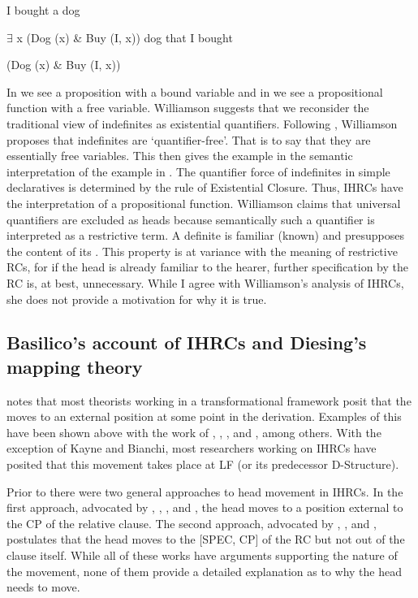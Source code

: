 \documentclass[output=paper]{LSP/langsci}
\begin{document}
\ea I bought a dog	\label{boyle40}

$\exists$ x (Dog (x) \& Buy (I, x))
\ex dog that I bought \label{boyle41}

(Dog (x) \& Buy (I, x))
\z	
	
In  we see a proposition with a bound variable and in  we see a propositional function with a free variable. Williamson suggests that we reconsider the traditional view of indefinites as existential quantifiers. Following \citet{Heim1982}, Williamson proposes that indefinites are `quantifier-free'. That is to say that they are essentially free variables. This then gives the example in  the semantic interpretation of the example in . The quantifier force of indefinites in simple declaratives is determined by the rule of Existential Closure. Thus, IHRCs have the interpretation of a propositional function. Williamson claims that universal quantifiers are excluded as heads because semantically such a quantifier is interpreted as a restrictive term. A definite is familiar (known) and presupposes the content of its .  This property is at variance with the meaning of restrictive RCs, for if the head is already familiar to the hearer, further specification by the RC is, at best, unnecessary.  While I agree with Williamson's analysis of IHRCs, she does not provide a motivation for why it is true.

\subsection{Basilico's account of IHRCs and Diesing's mapping theory}\label{sec:boyle:6.3}

\citet{Basilico1996} notes that most theorists working in a transformational framework posit that the  moves to an external position at some point in the derivation. Examples of this have been shown above with the work of \citet{Cole1982, Cole1987}, \citet{Williamson1987}, \citet{Culy1990}, \citet{Kayne1994} and \citet{Bianchi1999}, among others. With the exception of Kayne and Bianchi, most researchers working on IHRCs have posited that this movement takes place at LF (or its predecessor D-Structure). 

Prior to \citet{Basilico1996} there were two general approaches to head movement in IHRCs. In the first approach, advocated by \citet{Broadwell1985, Broadwell1987}, \citet{Cole1987}, \citet{LefebvreMuysken1988}, and \citet{ColeHermon1994}, the head moves to a position external to the CP of the relative clause. The second approach, advocated by \citet{Williamson1987}, \citet{Brassetal1989}, and \citet{Bonneau1992}, postulates that the head moves to the [SPEC, CP] of the RC but not out of the clause itself. While all of these works have arguments supporting the nature of the movement, none of them provide a detailed explanation as to why the head needs to move.  
\end{document}
